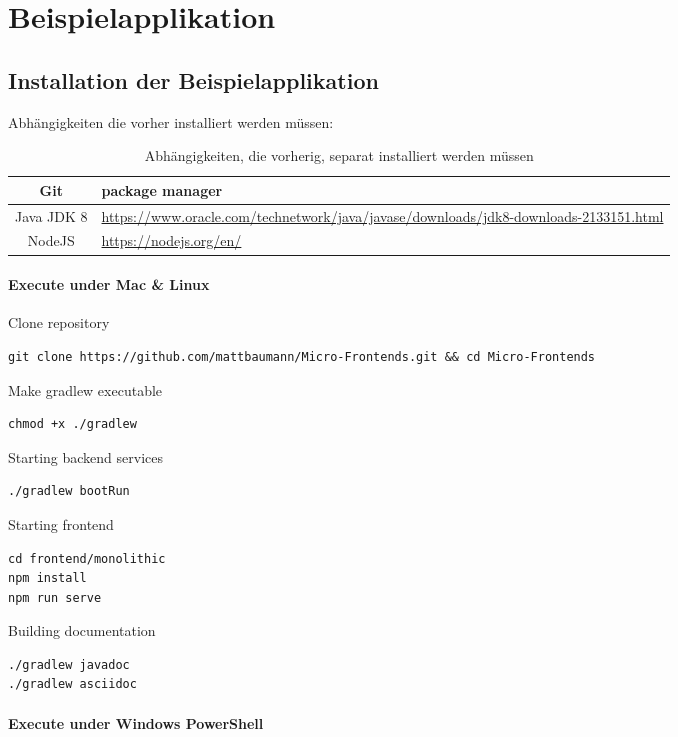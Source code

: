 \section{Beispielapplikation}

\subsection{Installation der Beispielapplikation}

Abhängigkeiten die vorher installiert werden müssen:

\begin{table}
\begin{tabularx}{\textwidth}{| c | X |}
    \hline
    Git & package manager
    \\ \hline
    Java JDK 8 & \url{https://www.oracle.com/technetwork/java/javase/downloads/jdk8-downloads-2133151.html}
    \\ \hline
    NodeJS & \url{https://nodejs.org/en/} 
    \\ \hline
\end{tabularx}
\caption{Abhängigkeiten, die vorherig, separat installiert werden müssen}
\end{table}
\paragraph{Execute under Mac \& Linux}

Clone repository
\begin{lstlisting}
git clone https://github.com/mattbaumann/Micro-Frontends.git && cd Micro-Frontends
\end{lstlisting}

Make gradlew executable
\begin{lstlisting}
chmod +x ./gradlew
\end{lstlisting}

Starting backend services
\begin{lstlisting}
./gradlew bootRun
\end{lstlisting}

Starting frontend
\begin{lstlisting}
cd frontend/monolithic
npm install
npm run serve
\end{lstlisting}

Building documentation
\begin{lstlisting}
./gradlew javadoc
./gradlew asciidoc
\end{lstlisting}

\paragraph{Execute under Windows PowerShell}

